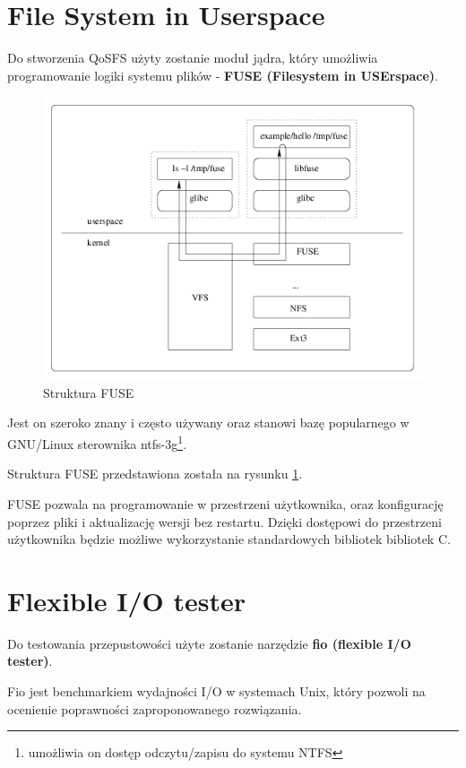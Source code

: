 \section{File System in Userspace}
Do stworzenia QoSFS użyty zostanie moduł jądra, który umożliwia programowanie
logiki systemu plików - \textbf{FUSE (Filesystem in USErspace)}. 

\begin{figure}[h!]
	\centering
	\includegraphics[scale=0.5]{fuse_structure.png}
		\caption{Struktura FUSE}
        \label{fig:fuse}
\end{figure}

Jest on szeroko znany i często używany
oraz stanowi bazę popularnego w GNU/Linux sterownika ntfs-3g\footnote{umożliwia
on dostęp odczytu/zapisu do systemu NTFS}.

Struktura FUSE przedstawiona została na rysunku \ref{fig:fuse}.

FUSE pozwala na programowanie w przestrzeni użytkownika, oraz konfigurację poprzez
pliki i aktualizację wersji bez restartu. 
Dzięki dostępowi do przestrzeni użytkownika będzie możliwe wykorzystanie standardowych
bibliotek bibliotek C.

\section{Flexible I/O tester}
Do testowania przepustowości użyte zostanie narzędzie \textbf{fio (flexible I/O tester)}.

Fio jest benchmarkiem wydajności I/O w systemach Unix, który pozwoli na
ocenienie poprawności zaproponowanego rozwiązania.

